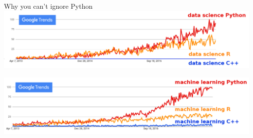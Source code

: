 \documentclass[aspectratio=169]{beamer}
\begin{document}
\begin{frame}{Why you can't ignore Python}
\vspace{0.5 cm}
\includegraphics[width=\linewidth]{python-r-cpp-googletrends-datascience.png}

\vspace{1 cm}
\includegraphics[width=\linewidth]{python-r-cpp-googletrends-machinelearning.png}
\end{frame}
\end{document}
